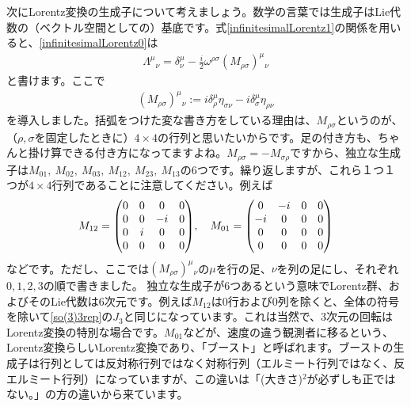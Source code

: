\documentclass[report,paper=a4, fontsize=12pt, line_length=16cm, number_of_lines=33,dvipdfmx]{jlreq}
\numberwithin{equation}{chapter}
\begin{document}
次にLorentz変換の生成子について考えましょう。数学の言葉では生成子はLie代数の（ベクトル空間としての）基底です。式\eqref{infinitesimalLorentz1}の関係を用いると、\eqref{infinitesimalLorentz0}は
\begin{align}
  \Lambda^{\mu}{}_{\nu}=\delta^{\mu}_{\nu}-\frac{i}{2}\omega^{\rho\sigma}(M_{\rho\sigma})^{\mu}{}_{\nu}
\end{align}
と書けます。ここで
\begin{align}
  (M_{\rho\sigma})^{\mu}{}_{\nu}:=i\delta^{\mu}_{\rho}\eta_{\sigma\nu}-i\delta^{\mu}_{\sigma}\eta_{\rho\nu}\label{vectorrep0}
\end{align}
を導入しました。括弧をつけた変な書き方をしている理由は、$M_{\rho\sigma}$というのが、（$\rho,\sigma$を固定したときに）$4\times 4$の行列と思いたいからです。足の付き方も、ちゃんと掛け算できる付き方になってますよね。$M_{\rho\sigma}=-M_{\sigma\rho}$ですから、独立な生成子は$M_{01},\ M_{02},\ M_{03},\ M_{12},\ M_{23},\ M_{13}$の6つです。繰り返しますが、これら１つ１つが$4\times 4$行列であることに注意してください。例えば
\begin{align}
  M_{12}=\mqty(
    0 & 0 & 0 & 0 \\  
    0 & 0 & -i & 0 \\  
    0 & i & 0 & 0 \\  
    0 & 0 & 0 & 0 \\  
  ),\quad
  M_{01}=\mqty(
    0 & -i& 0 & 0 \\  
    -i& 0 & 0 & 0 \\  
    0 & 0 & 0 & 0 \\  
    0 & 0 & 0 & 0 \\  
  )
\end{align}
などです。ただし、ここでは$(M_{\rho\sigma})^{\mu}{}_{\nu}$の$\mu$を行の足、$\nu$を列の足にし、それぞれ$0,1,2,3$の順で書きました。
独立な生成子が6つあるという意味でLorentz群、およびそのLie代数は6次元です。例えば$M_{12}$は$0$行および$0$列を除くと、全体の符号を除いて\eqref{so(3)3rep}の$J_3$と同じになっています。これは当然で、3次元の回転はLorentz変換の特別な場合です。$M_{01}$などが、速度の違う観測者に移るという、Lorentz変換らしいLorentz変換であり、「ブースト」と呼ばれます。ブーストの生成子は行列としては反対称行列ではなく対称行列（エルミート行列ではなく、反エルミート行列）になっていますが、この違いは「(大きさ)${}^2$が必ずしも正ではない。」の方の違いから来ています。
\end{document}
